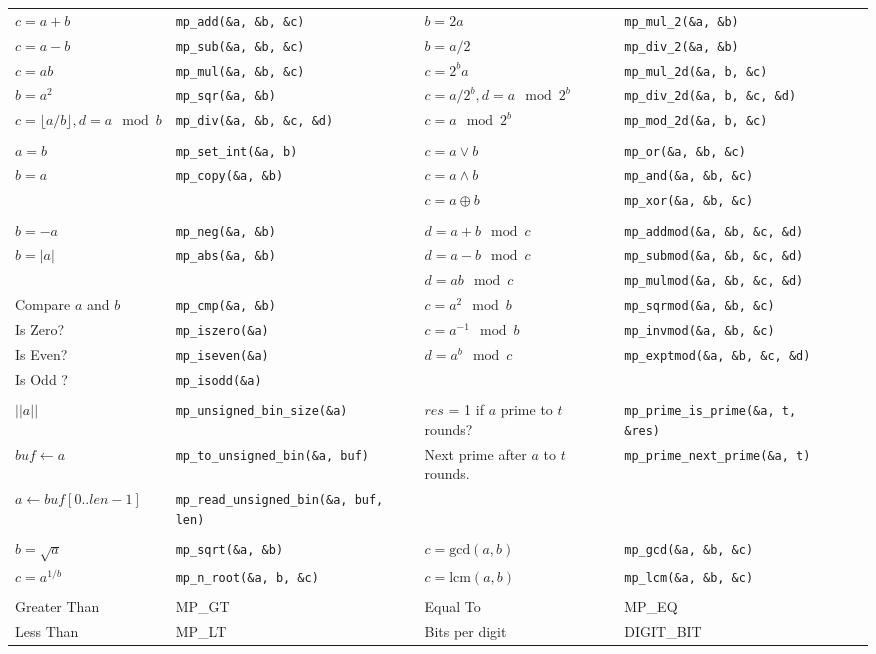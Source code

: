 \documentclass[landscape,11pt]{article}
\begin{document}
\hspace*{-3in}
\begin{tabular}{llllll}
$c = a + b$  & {\tt mp\_add(\&a, \&b, \&c)} & $b = 2a$  & {\tt mp\_mul\_2(\&a, \&b)} & \\
$c = a - b$  & {\tt mp\_sub(\&a, \&b, \&c)} & $b = a/2$ & {\tt mp\_div\_2(\&a, \&b)} & \\
$c = ab $   & {\tt mp\_mul(\&a, \&b, \&c)}  & $c = 2^ba$  & {\tt mp\_mul\_2d(\&a, b, \&c)}  \\
$b = a^2 $  & {\tt mp\_sqr(\&a, \&b)}       & $c = a/2^b, d = a \mod 2^b$ & {\tt mp\_div\_2d(\&a, b, \&c, \&d)} \\
$c = \lfloor a/b \rfloor, d = a \mod b$ & {\tt mp\_div(\&a, \&b, \&c, \&d)} & $c = a \mod 2^b $  & {\tt mp\_mod\_2d(\&a, b, \&c)}  \\
 && \\
$a = b $  & {\tt mp\_set\_int(\&a, b)}  & $c = a \vee b$  & {\tt mp\_or(\&a, \&b, \&c)}  \\
$b = a $  & {\tt mp\_copy(\&a, \&b)} & $c = a \wedge b$  & {\tt mp\_and(\&a, \&b, \&c)}  \\
 && $c = a \oplus b$  & {\tt mp\_xor(\&a, \&b, \&c)}  \\
 & \\
$b = -a $  & {\tt mp\_neg(\&a, \&b)}  & $d = a + b \mod c$  & {\tt mp\_addmod(\&a, \&b, \&c, \&d)}  \\
$b = |a| $  & {\tt mp\_abs(\&a, \&b)} & $d = a - b \mod c$  & {\tt mp\_submod(\&a, \&b, \&c, \&d)}  \\
 && $d = ab \mod c$  & {\tt mp\_mulmod(\&a, \&b, \&c, \&d)}  \\
Compare $a$ and $b$ & {\tt mp\_cmp(\&a, \&b)} & $c = a^2 \mod b$  & {\tt mp\_sqrmod(\&a, \&b, \&c)}  \\
Is Zero? & {\tt mp\_iszero(\&a)} & $c = a^{-1} \mod b$  & {\tt mp\_invmod(\&a, \&b, \&c)} \\
Is Even? & {\tt mp\_iseven(\&a)} & $d = a^b \mod c$ & {\tt mp\_exptmod(\&a, \&b, \&c, \&d)} \\
Is Odd ? & {\tt mp\_isodd(\&a)} \\
&\\
$\vert \vert a \vert \vert$ & {\tt mp\_unsigned\_bin\_size(\&a)} & $res$ = 1 if $a$ prime to $t$ rounds? & {\tt mp\_prime\_is\_prime(\&a, t, \&res)} \\
$buf \leftarrow a$          & {\tt mp\_to\_unsigned\_bin(\&a, buf)} & Next prime after $a$ to $t$ rounds. & {\tt mp\_prime\_next\_prime(\&a, t)} \\
$a \leftarrow buf[0..len-1]$          & {\tt mp\_read\_unsigned\_bin(\&a, buf, len)} \\
&\\
$b = \sqrt{a}$ & {\tt mp\_sqrt(\&a, \&b)}  & $c = \mbox{gcd}(a, b)$ & {\tt mp\_gcd(\&a, \&b, \&c)} \\
$c = a^{1/b}$ & {\tt mp\_n\_root(\&a, b, \&c)} & $c = \mbox{lcm}(a, b)$ & {\tt mp\_lcm(\&a, \&b, \&c)} \\
&\\
Greater Than & MP\_GT & Equal To & MP\_EQ \\
Less Than & MP\_LT & Bits per digit & DIGIT\_BIT \\
\end{tabular}
\end{document}
